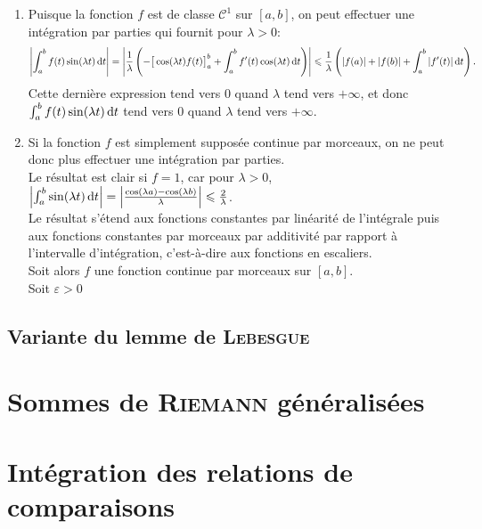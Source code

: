 \begin{solution}
    \begin{enumerate}
        \item Puisque la fonction $f$ est de classe $\mathscr{C}^1$ sur $[a, b]$, on peut effectuer une intégration par parties qui fournit pour $\lambda > 0$:
        $$\left| \int_a^b f(t) \sin(\lambda t) \, \mathrm{d} t \right| = \left| \frac{1}{\lambda} \left( -\big[ \cos(\lambda t) f(t) \big]_a^b + \int_a^b f'(t) \cos(\lambda t) \, \mathrm{d} t  \right) \right| \leqslant \frac{1}{\lambda} \left( |f(a)| + |f(b)| + \int_a^b |f'(t)| \, \mathrm{d} t \right).$$
        Cette dernière expression tend vers $0$ quand $\lambda$ tend vers $+ \infty$, et donc $\int_a^b f(t) \sin(\lambda t) \, \mathrm{d} t$ tend vers $0$ quand $\lambda$ tend vers $+\infty$.
        \item Si la fonction $f$ est simplement supposée continue par morceaux, on ne peut donc plus effectuer une intégration par parties. \\
        Le résultat est clair si $f = 1$, car pour $\lambda > 0$, $\left| \int_a^b \sin(\lambda t) \, \mathrm{d} t \right| = \left| \frac{\cos(\lambda a) - \cos(\lambda b)}{\lambda} \right| \leqslant \frac{2}{\lambda}$. \\
        Le résultat s'étend aux fonctions constantes par linéarité de l'intégrale puis aux fonctions constantes par morceaux par additivité par rapport à l'intervalle d'intégration, c'est-à-dire aux fonctions en escaliers. \\
        Soit alors $f$ une fonction continue par morceaux sur $[a, b]$. \\
        Soit $\varepsilon > 0$
    \end{enumerate}
\end{solution}

\subsection{Variante du lemme de \textsc{Lebesgue}}


\section{Sommes de \textsc{Riemann} généralisées}


\section{Intégration des relations de comparaisons}



